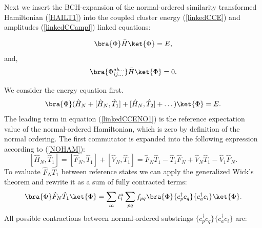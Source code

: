 \documentclass[twoside,english]{uiofysmaster}
\begin{document}
Next we insert the BCH-expansion of the normal-ordered similarity
transformed Hamiltonian (\ref{HAILT1}) into the coupled cluster energy
(\ref{linkedCCE}) and amplitudes (\ref{linkedCCampl}) linked
equations:

\begin{equation}\label{linkedCCENO}
\bra{\Phi}\bar{H}\ket{\Phi} = E,
\end{equation}
and,
\begin{equation}\label{linkedCCamplNO}
\bra{\Phi_{ij\dots}^{ab\dots}}\bar{H}\ket{\Phi} = 0.
\end{equation}

We consider the energy equation first. 
\begin{equation}\label{linkedCCENO1}
\bra{\Phi}	(\hat{H}_N + [\hat{H}_N,\hat{T}_1] + [\hat{H}_N,\hat{T}_2] + \dots)	\ket{\Phi} = E.
\end{equation}
The leading term in equation (\ref{linkedCCENO1}) is the reference
expectation value of the normal-ordered Hamiltonian, which is zero by
definition of the normal ordering. The first commutator is expanded
into the following expression according to (\ref{NOHAM}):
\begin{equation}\label{commstrings}
[\hat{H}_N,\hat{T}_1] =  [\hat{F}_N,\hat{T}_1] + [\hat{V}_N,\hat{T}_1] =  \hat{F}_N\hat{T}_1 - \hat{T}_1 \hat{F}_N + \hat{V}_N\hat{T}_1 - \hat{V}_1 \hat{F}_N.
\end{equation}
To evaluate $\hat{F}_N\hat{T}_1$ between reference states we can apply the generalized Wick's theorem and rewrite it as a sum of fully contracted terms:
\begin{align}
\bra{\Phi}\hat{F}_N\hat{T}_1\ket{\Phi} = \sum_{ia}t_{i}^{a} \sum_{pq} f_{pq} \bra{\Phi} \{c^\dagger_p c_q\}\{ c^\dag_{a} c_{i}\} \ket{\Phi}.
\end{align}
All possible contractions between normal-ordered substrings $\{c^\dagger_pc_q\}        \{ c^\dag_{a} c_{i}\}$ are:
\end{document}
